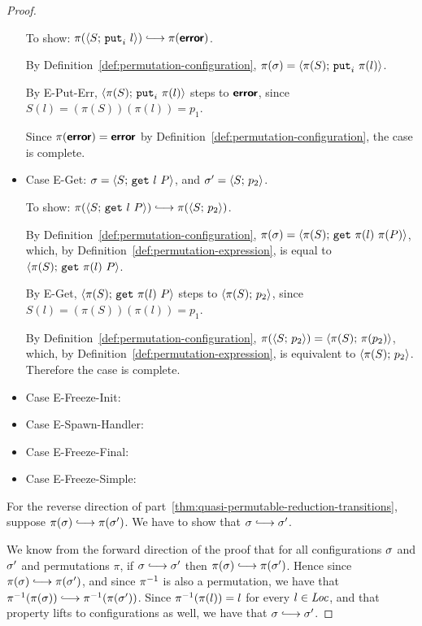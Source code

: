 \begin{proof}
\begin{itemize}
      To show: $\pi(\config{S}{\putiexp{l}}) \parstepsto
      \pi(\error)$.

      By Definition~\ref{def:permutation-configuration}, $\pi(\sigma) =
      \langle \pi(S);\, \mbox{\texttt{put}}_i~\pi(l) \rangle$.

      By {\sc E-Put-Err}, $\langle \pi(S);\, \mbox{\texttt{put}}_i~\pi(l) \rangle$ steps to
      $\textbf{\textsf{error}}$, since $S(l) = (\pi(S))(\pi(l)) = p_1$.

      Since $\pi(\textbf{\textsf{error}}) = \textbf{\textsf{error}}$ by
      Definition~\ref{def:permutation-configuration}, the case is
      complete.
    \item Case {\sc E-Get}: $\sigma = \langle S;\, \mbox{\texttt{get}}~l~P \rangle$, and
      $\sigma' = \langle S;\, p_2 \rangle$.

      To show: $\pi(\config{S}{\getexp{l}{P}}) \parstepsto
      \pi(\config{S}{p_2})$.

      By Definition~\ref{def:permutation-configuration}, $\pi(\sigma) =
      \langle \pi(S);\, \mbox{\texttt{get}}~\pi(l)~\pi(P) \rangle$, which, by
      Definition~\ref{def:permutation-expression}, is equal to
      $\langle \pi(S);\, \mbox{\texttt{get}}~\pi(l)~P \rangle$.

      By {\sc E-Get}, $\langle \pi(S);\, \mbox{\texttt{get}}~\pi(l)~P \rangle$ steps to
      $\langle \pi(S);\, p_2 \rangle$, since $S(l) = (\pi(S))(\pi(l)) = p_1$.

      By Definition~\ref{def:permutation-configuration},
      $\pi(\langle S;\, p_2 \rangle) = \langle \pi(S);\, \pi(p_2) \rangle$, which, by
      Definition~\ref{def:permutation-expression}, is equivalent to
      $\langle \pi(S);\, p_2 \rangle$.  Therefore the case is complete.
    \item Case {\sc E-Freeze-Init}: 
    \item Case {\sc E-Spawn-Handler}: 
    \item Case {\sc E-Freeze-Final}: 
    \item Case {\sc E-Freeze-Simple}: 
  \end{itemize}

  For the reverse direction of
  part~\ref{thm:quasi-permutable-reduction-transitions}, suppose
  $\pi(\conf) \parstepsto \pi(\conf')$.  We have to show that $\conf
  \parstepsto \conf'$.

  We know from the forward direction of the proof that for all
  configurations $\sigma$ and $\sigma'$ and permutations $\pi$, if
  $\conf \parstepsto \conf'$ then $\pi(\conf) \parstepsto
  \pi(\conf')$.  Hence since $\pi(\conf) \parstepsto \pi(\conf')$, and
  since $\pi^{-1}$ is also a permutation, we have that
  $\piinv(\pi(\conf)) \parstepsto \piinv(\pi(\conf'))$.  Since
  $\pi^{-1}(\pi(l)) = l$ for every $l \in \mathit{Loc}$, and that property lifts
  to configurations as well, we have that $\conf \parstepsto \conf'$.


\end{proof}

